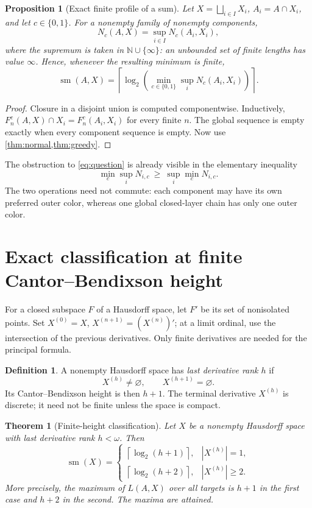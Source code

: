 \documentclass[11pt,letterpaper]{article}
\numberwithin{equation}{section}
\newtheorem{theorem}{Theorem}[section]
\newtheorem{proposition}[proposition]{Proposition}
\theoremstyle{definition}
\newtheorem{definition}[definition]{Definition}
\theoremstyle{remark}
\theoremstyle{definition}
\newcommand{\sm}{\operatorname{sm}}
\newcommand{\ceil}[1]{\left\lceil#1\right\rceil}
\newcommand{\N}{\mathbb N}
\newcommand{\bigsqsum}{\bigsqcup}
\begin{document}
\begin{proposition}[Exact finite profile of a sum]\label{prop:profile-sum}
Let $X=\bigsqsum_{i\in I}X_i$, $A_i=A\cap X_i$, and let $c\in\{0,1\}$.
For a nonempty family of nonempty components,
\begin{equation}\label{eq:profile-sum}
 N_c(A,X)=\sup_{i\in I}N_c(A_i,X_i),
\end{equation}
where the supremum is taken in $\N\cup\{\infty\}$: an unbounded set of finite
lengths has value $\infty$. Hence, whenever the resulting minimum is finite,
\begin{equation}\label{eq:sumexact}
 \sm(A,X)=\ceil{\log_2\!\left(
   \min_{c\in\{0,1\}}\sup_i N_c(A_i,X_i)\right)}.
\end{equation}
\end{proposition}
\begin{proof}
Closure in a disjoint union is computed componentwise. Inductively,
$F^c_n(A,X)\cap X_i=F^c_n(A_i,X_i)$ for every finite $n$. The global sequence
is empty exactly when every component sequence is empty. Now use
\cref{thm:normal,thm:greedy}.
\end{proof}

The obstruction to \eqref{eq:question} is already visible in the elementary
inequality
\[
 \min_c\sup_i N_{i,c}\ \geq\ \sup_i\min_c N_{i,c}.
\]
The two operations need not commute: each component may have its own preferred
outer color, whereas one global closed-layer chain has only one outer color.

\section{Exact classification at finite Cantor--Bendixson height}
\label{sec:height}

For a closed subspace $F$ of a Hausdorff space, let $F'$ be its set of
nonisolated points. Set $X^{(0)}=X$, $X^{(n+1)}=(X^{(n)})'$; at a limit ordinal,
use the intersection of the previous derivatives. Only finite derivatives are
needed for the principal formula.

\begin{definition}
A nonempty Hausdorff space has \emph{last derivative rank $h$} if
\[
 X^{(h)}\ne\varnothing,\qquad X^{(h+1)}=\varnothing.
\]
Its Cantor--Bendixson height is then $h+1$. The terminal derivative $X^{(h)}$
is discrete; it need not be finite unless the space is compact.
\end{definition}

\begin{theorem}[Finite-height classification]\label{thm:height}
Let $X$ be a nonempty Hausdorff space with last derivative rank $h<\omega$.
Then
\begin{equation}\label{eq:height}
 \boxed{\quad
 \sm(X)=
 \begin{cases}
  \ceil{\log_2(h+1)},& |X^{(h)}|=1,\\[2pt]
  \ceil{\log_2(h+2)},& |X^{(h)}|\geq2.
 \end{cases}\quad}
\end{equation}
More precisely, the maximum of $L(A,X)$ over all targets is $h+1$ in the first
case and $h+2$ in the second. The maxima are attained.
\end{theorem}
\end{document}
